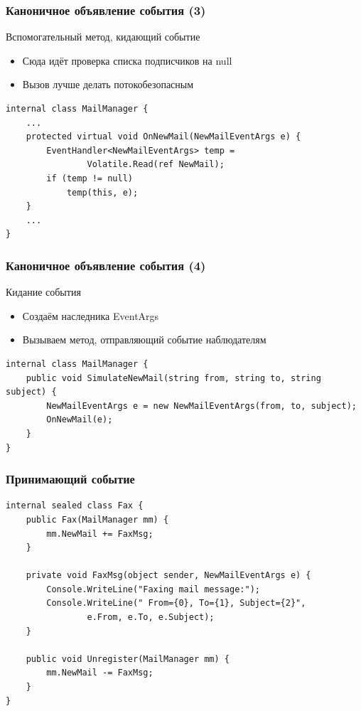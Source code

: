 \documentclass[xetex,mathserif,serif]{beamer}
\begin{document}
    \begin{frame}[fragile]
        \frametitle{Каноничное объявление события (3)}
        Вспомогательный метод, кидающий событие
        \begin{itemize}
            \item Сюда идёт проверка списка подписчиков на null
            \item Вызов лучше делать потокобезопасным
        \end{itemize}
        \vspace{5mm}
        \begin{verbatim}
internal class MailManager {
    ...
    protected virtual void OnNewMail(NewMailEventArgs e) {
        EventHandler<NewMailEventArgs> temp = 
                Volatile.Read(ref NewMail);
        if (temp != null) 
            temp(this, e);
    }
    ...
}
        \end{verbatim}
    \end{frame}

    \begin{frame}[fragile]
        \frametitle{Каноничное объявление события (4)}
        Кидание события
        \begin{itemize}
            \item Создаём наследника EventArgs
            \item Вызываем метод, отправляющий событие наблюдателям
        \end{itemize}
        \vspace{5mm}
        \begin{verbatim}
internal class MailManager {
    public void SimulateNewMail(string from, string to, string subject) {
        NewMailEventArgs e = new NewMailEventArgs(from, to, subject);
        OnNewMail(e);
    }
}
        \end{verbatim}
    \end{frame}

    \begin{frame}[fragile]
        \frametitle{Принимающий событие}
        \begin{verbatim}
internal sealed class Fax {
    public Fax(MailManager mm) {
        mm.NewMail += FaxMsg;
    }

    private void FaxMsg(object sender, NewMailEventArgs e) {
        Console.WriteLine("Faxing mail message:");
        Console.WriteLine(" From={0}, To={1}, Subject={2}",
                e.From, e.To, e.Subject);
    }

    public void Unregister(MailManager mm) {
        mm.NewMail -= FaxMsg;
    }
}
        \end{verbatim}
    \end{frame}
\end{document}
